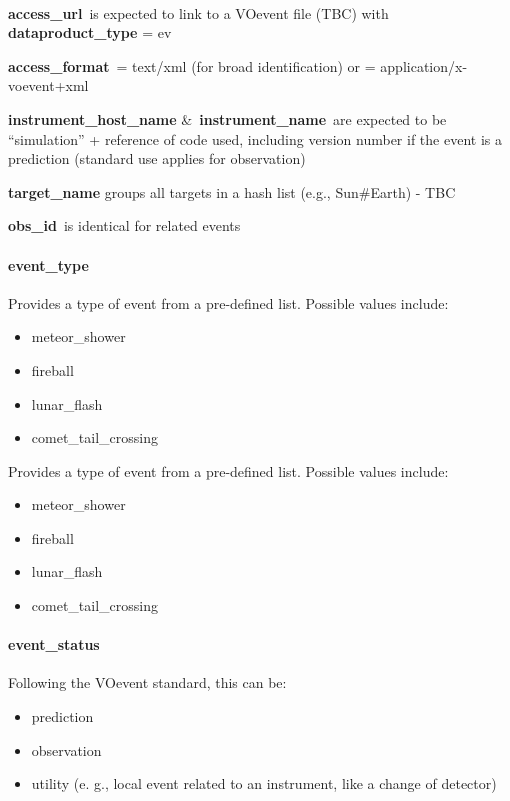 \documentclass[11pt,a4paper]{ivoa}
\begin{document}
\\

\textbf{access\_url} is expected to link to a VOevent file (TBC) with \textbf{dataproduct\_type} = ev 

\textbf{access\_format} = text/xml (for broad identification) or = application/x-voevent+xml 

\textbf{instrument\_host\_name }\& \textbf{instrument\_name} are expected to be ``simulation'' + reference of code used, including version number if the event is a prediction (standard use applies for observation)

\textbf{target\_name} groups all targets in a hash list (e.g., Sun\#Earth) - TBC

\textbf{obs\_id} is identical for related events

\paragraph{event\_type}

Provides a type of event from a pre-defined list. Possible values include:

\begin{itemize}
\item meteor\_shower
\item fireball
\item lunar\_flash
\item comet\_tail\_crossing
\end{itemize}

Provides a type of event from a pre-defined list. Possible values include:

\begin{itemize}
\item meteor\_shower
\item fireball
\item lunar\_flash
\item comet\_tail\_crossing
\end{itemize}

\paragraph{event\_status}

Following the VOevent standard, this can be:

\begin{itemize}
\item prediction
\item observation
\item utility (e. g., local event related to an instrument, like a change of detector)
\end{itemize}
\end{document}
